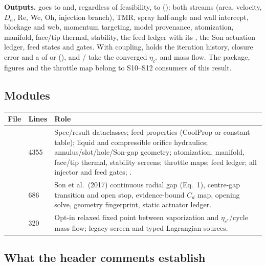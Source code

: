 \textbf{Outputs.}  goes to
 and, regardless of feasibility, to 
(): both streams (area, velocity, $D_h$, Re, We, Oh, injection
branch), TMR, spray half-angle and wall intercept, blockage and web, momentum
targeting, model provenance, atomization, manifold, face/tip thermal, stability,
the feed ledger with its , the Son actuation ledger, feed
states and gates. With coupling,  holds the
iteration history, closure error and a  of
 or
 (), and
/ take the converged
$\eta_{c^*}$ and mass flow. The  package, 
figures and the throttle map belong to S10--S12 consumers of this result.

\subsection{Modules}

{\small
\begin{longtable}{@{}P{4.2cm}P{1.0cm}P{11.0cm}@{}}
\toprule
\textbf{File} & \textbf{Lines} & \textbf{Role} \\
\midrule
\endhead
{} & 4355 & Spec/result dataclasses; feed properties (CoolProp or constant table); liquid and compressible orifice hydraulics; annulus/slot/hole/Son-gap geometry; atomization, manifold, face/tip thermal, stability screens; throttle maps; feed ledger; all injector and feed gates; . \\
 & 686 & Son et al.\ (2017) continuous radial gap (Eq.~1), centre-gap transition and open stop, evidence-bound $C_d$ map, opening solve, geometry fingerprint, static actuator ledger. \\
 & 320 & Opt-in relaxed fixed point between vaporization and $\eta_{c^*}$/cycle mass flow; legacy-screen and typed Lagrangian sources. \\
\bottomrule
\end{longtable}}

\subsection{What the header comments establish}


